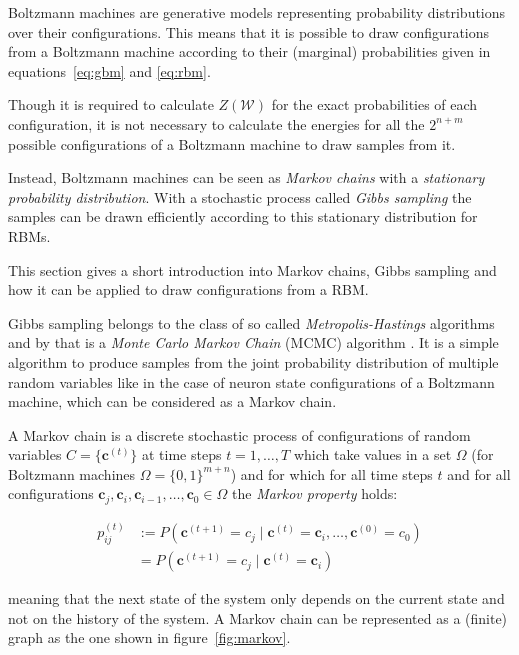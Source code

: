 Boltzmann machines are generative models representing probability distributions over their 
configurations. This means that it is possible to draw configurations from a Boltzmann machine
according to their (marginal) probabilities given in equations~\ref{eq:gbm} and \ref{eq:rbm}.

Though it is required to calculate $Z(\mathcal{W})$ for the exact probabilities of each configuration,
it is not necessary to calculate the energies for all the $2^{n+m}$ possible configurations of 
a Boltzmann machine to draw samples from it.

Instead, Boltzmann machines can be seen as \textit{Markov chains} with a \textit{stationary probability
distribution}. With a stochastic process called \textit{Gibbs sampling} the samples can be drawn 
efficiently according to this stationary distribution for RBMs.

This section gives a short introduction into Markov chains, Gibbs sampling and how it can be applied 
to draw configurations from a RBM.

Gibbs sampling belongs to the class of so called \textit{Metropolis-Hastings} algorithms and by that is 
a \textit{Monte Carlo Markov Chain} (MCMC) algorithm \cite{hastings1970monte}. It is a simple algorithm to produce samples from the 
joint probability distribution of multiple random variables like in the case of neuron state configurations
of a Boltzmann machine, which can be considered as a Markov chain.

A Markov chain is a discrete stochastic process of configurations of random variables $C=\{\bm{c}^{(t)}\}$
at time steps $t=1, \dots, T$ which take values in a set $\Omega$ (for Boltzmann machines 
$\Omega=\{0,1\}^{m+n}$) and for which for all time steps $t$ and for all configurations 
$\bm{c}_j, \bm{c}_i, \bm{c}_{i-1}, \dots, \bm{c}_0 \in \Omega$ the \textit{Markov property} holds:

\begin{align}
    p_{ij}^{(t)} &:= P(\bm{c}^{(t+1)} = c_j \mid \bm{c}^{(t)} = \bm{c}_i, \dots, \bm{c}^{(0)} = c_0) \\
                 & = P(\bm{c}^{(t+1)} = c_j \mid \bm{c}^{(t)} = \bm{c}_i) 
\end{align}

meaning that the next state of the system only depends on the current state and not on the 
history of the system. A Markov chain can be represented as a (finite) graph 
as the one shown in figure~\ref{fig:markov}.

